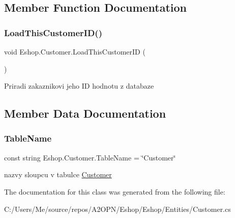 \subsection{Member Function Documentation}
\mbox{\label{class_eshop_1_1_customer_aabd2fbc8a9b8353e07fb7ad191464ef1}} 
\subsubsection{\texorpdfstring{LoadThisCustomerID()}{LoadThisCustomerID()}}
{\footnotesize\ttfamily void Eshop.\+Customer.\+Load\+This\+Customer\+ID (\begin{DoxyParamCaption}{ }\end{DoxyParamCaption})}



Priradi zakaznikovi jeho ID hodnotu z databaze 



\subsection{Member Data Documentation}
\mbox{\label{class_eshop_1_1_customer_aaca79a11328569acabc8e6441b103ef3}} 
\subsubsection{\texorpdfstring{TableName}{TableName}}
{\footnotesize\ttfamily const string Eshop.\+Customer.\+Table\+Name = \char`\"{}Customer\char`\"{}}



nazvy sloupcu v tabulce \mbox{\hyperlink{class_eshop_1_1_customer}{Customer}} 



The documentation for this class was generated from the following file\+:\begin{DoxyCompactItemize}
\item 
C\+:/\+Users/\+Me/source/repos/\+A2\+O\+P\+N/\+Eshop/\+Eshop/\+Entities/Customer.\+cs\end{DoxyCompactItemize}
